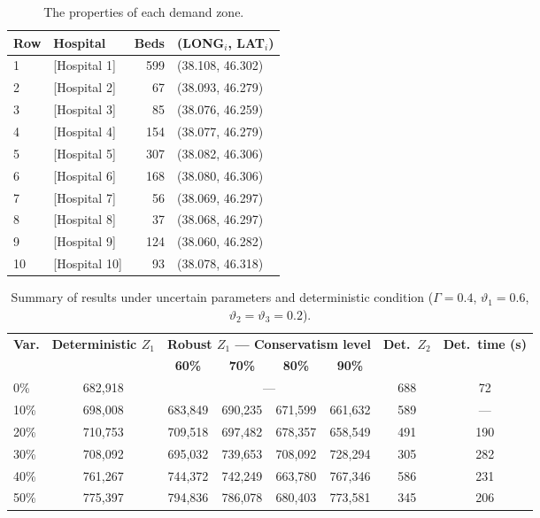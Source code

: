 \documentclass[10pt,twocolumn]{article}
\newcommand{\tabfont}{\fontsize{8}{9.5}\selectfont}
\newcommand{\headfont}{\fontsize{8.5}{10}\selectfont\bfseries}
\renewcommand{\arraystretch}{1.1}
\begin{document}
\begin{table}[H]
\caption{The properties of each demand zone.}
\label{tab:hospitals}
\tabfont
\setlength{\tabcolsep}{4pt}
\begin{tabular}{lp{2.8cm}rp{2.0cm}}
\toprule
\headfont Row & \headfont Hospital
  & \headfont Beds & \headfont (LONG$_i$, LAT$_i$) \\
\midrule
1  & [Hospital 1]  & 599 & (38.108, 46.302) \\
2  & [Hospital 2]  &  67 & (38.093, 46.279) \\
3  & [Hospital 3]  &  85 & (38.076, 46.259) \\
4  & [Hospital 4]  & 154 & (38.077, 46.279) \\
5  & [Hospital 5]  & 307 & (38.082, 46.306) \\
6  & [Hospital 6]  & 168 & (38.080, 46.306) \\
7  & [Hospital 7]  &  56 & (38.069, 46.297) \\
8  & [Hospital 8]  &  37 & (38.068, 46.297) \\
9  & [Hospital 9]  & 124 & (38.060, 46.282) \\
10 & [Hospital 10] &  93 & (38.078, 46.318) \\
\bottomrule
\end{tabular}
\end{table}

\begin{table}[ht]
\caption{Summary of results under uncertain parameters and
deterministic condition ($\Gamma=0.4$, $\vartheta_1=0.6$,
$\vartheta_2=\vartheta_3=0.2$).}
\label{tab:results}
\tabfont
\setlength{\tabcolsep}{4pt}
\renewcommand{\arraystretch}{1.20}
\begin{tabular}{lccccccc}
\toprule
\multirow{2}{*}{\headfont Var.}
 & \headfont Deterministic $Z_1$
 & \multicolumn{4}{c}{\headfont Robust $Z_1$ --- Conservatism level}
 & \headfont Det.\ $Z_2$
 & \headfont Det.\ time (s) \\
\cmidrule(lr){3-6}
 & & \headfont 60\% & \headfont 70\% & \headfont 80\% & \headfont 90\%
 & & \\
\midrule
0\%  & 682,918 & \multicolumn{4}{c}{---}      & 688 & 72  \\
10\% & 698,008 & 683,849 & 690,235 & 671,599 & 661,632 & 589 & --- \\
20\% & 710,753 & 709,518 & 697,482 & 678,357 & 658,549 & 491 & 190 \\
30\% & 708,092 & 695,032 & 739,653 & 708,092 & 728,294 & 305 & 282 \\
40\% & 761,267 & 744,372 & 742,249 & 663,780 & 767,346 & 586 & 231 \\
50\% & 775,397 & 794,836 & 786,078 & 680,403 & 773,581 & 345 & 206 \\
\bottomrule
\end{tabular}
\end{table}
\end{document}
